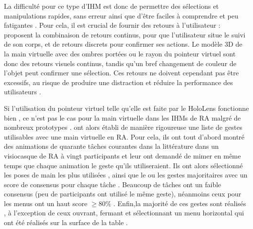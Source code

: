 La difficulté pour ce type d'IHM est donc de permettre des sélections et manipulations rapides, sans erreur ainsi que d'être faciles à comprendre et peu fatigantes \citep{Argelaguet2013}. Pour cela, il est crucial de fournir des retours à l'utilisateur : \cite{Chan2010} proposent la combinaison de retours continus, pour que l'utilisateur situe le suivi de son corps, et de retours discrets pour confirmer ses actions. Le modèle 3D de la main virtuelle avec des ombres portées ou le rayon du pointeur virtuel sont donc des retours visuels continus, tandis qu'un bref changement de couleur de l'objet peut confirmer une sélection. Ces retours ne doivent cependant pas être excessifs, au risque de produire une distraction et réduire la performance des utilisateurs \citep{Argelaguet2013}.



Si l'utilisation du pointeur virtuel telle qu'elle est faite par le HoloLens fonctionne bien \citep{Kytoe2018}, ce n'est pas le cas pour la main virtuelle dans les IHMs de RA malgré de nombreux prototypes \citep{Piumsomboon2013}. \cite{Piumsomboon2013} ont alors établi de manière rigoureuse une liste de gestes utilisables avec une main virtuelle en RA. Pour cela, ils ont tout d'abord montré des animations de quarante tâches courantes dans la littérature dans un visiocasque de RA à vingt participants et leur ont demandé de mimer en même temps que chaque animation le geste qu'ils utiliseraient. Ils ont alors sélectionné les poses de main les plus utilisées , ainsi que le ou les gestes majoritaires avec un score de consensus pour chaque tâche . Beaucoup de tâches ont un faible consensus (peu de participants ont utilisé le même geste), néanmoins ceux pour les menus ont un haut score $\geq 80\%$ . Enfin,la majorité de ces gestes sont réalisés , à l'exception de ceux ouvrant, fermant et sélectionnant un menu horizontal qui ont été réalisés sur la surface de la table .


